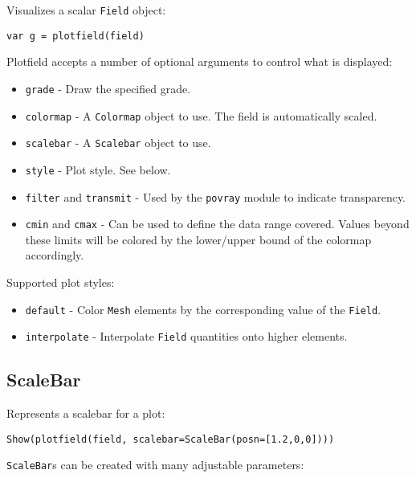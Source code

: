 Visualizes a scalar \texttt{Field} object:

\begin{lstlisting}
var g = plotfield(field)
\end{lstlisting}

Plotfield accepts a number of optional arguments to control what is
displayed:

\begin{itemize}

\item
  \texttt{grade} - Draw the specified grade.
\item
  \texttt{colormap} - A \texttt{Colormap} object to use. The field is
  automatically scaled.
\item
  \texttt{scalebar} - A \texttt{Scalebar} object to use.
\item
  \texttt{style} - Plot style. See below.
\item
  \texttt{filter} and \texttt{transmit} - Used by the \texttt{povray}
  module to indicate transparency.
\item
  \texttt{cmin} and \texttt{cmax} - Can be used to define the data range
  covered. Values beyond these limits will be colored by the lower/upper
  bound of the colormap accordingly.
\end{itemize}

Supported plot styles:

\begin{itemize}

\item
  \texttt{default} - Color \texttt{Mesh} elements by the corresponding
  value of the \texttt{Field}.
\item
  \texttt{interpolate} - Interpolate \texttt{Field} quantities onto
  higher elements.
\end{itemize}

\hypertarget{scalebar}{%
\subsection{ScaleBar}\label{scalebar}}

Represents a scalebar for a plot:

\begin{lstlisting}
Show(plotfield(field, scalebar=ScaleBar(posn=[1.2,0,0])))
\end{lstlisting}

\texttt{ScaleBar}s can be created with many adjustable parameters:


